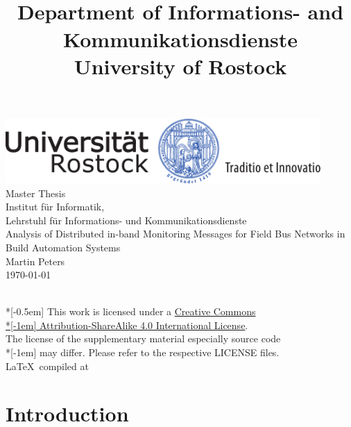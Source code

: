 \documentclass[12pt, a4paper, titlepage]{book}
\title{\thetitle\\[24pt]
	\small Department of \alert{Informations- and Kommunikationsdienste}\\[-3pt]
	\small University of Rostock}
\author{\theauthor}
\date{\thedate}
\newcommand{\alert}[1]{{\color{red}#1}}
\newcommand{\thedate}{\today}
\newcommand{\theauthor}{Martin Peters}
\newcommand{\thetitle}{Analysis of Distributed in-band Monitoring Messages for Field Bus Networks in Build Automation Systems}
\begin{document}
	\begin{titlepage}
		\centering
		\includegraphics[width=0.9\textwidth]{style/UNI-Logo_Siegel_4c_115mm.pdf}
		\\[1.3cm]
		{\Huge Master Thesis}\\[0.5cm]
		{\large\alert{ Institut für Informatik,\\Lehrstuhl für Informations- und Kommunikationsdienste}}
		\\[3.5cm]
		{\Huge \thetitle}
		\\[2cm]
		{\large\theauthor\\[0.5cm]\thedate}
	\end{titlepage}
	~ \vfill
	{
		\tiny \noindent
		{\normalsize \href{http://creativecommons.org/licenses/by-sa/4.0/}{\ccbysa}} \\*[-0.5em]
		This work is licensed under a \href{http://creativecommons.org/licenses/by-sa/4.0/}{Creative Commons\\*[-1em] Attribution-ShareAlike 4.0 International License}. \\
		The license of the supplementary material especially source code\\*[-1em]
		may differ. Please refer to the respective LICENSE files.\\
		\LaTeX ~compiled at \DTMnow
	}
	\pagebreak
	\clearpage
	\setcounter{page}{1}
	\tableofcontents
	\listoffigures
	\listoftables
	
	\newpage
	
	\chapter{Introduction}
	\label{sec:intro}
	
	
\end{document}
